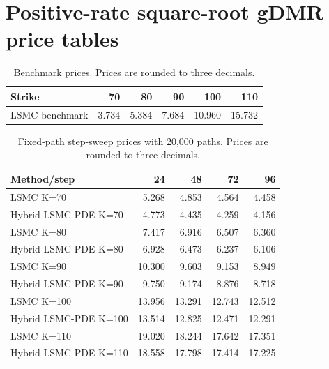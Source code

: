 \section*{Positive-rate square-root gDMR price tables}
\begin{table}[htbp]\centering
\caption{Benchmark prices. Prices are rounded to three decimals.}
\begin{tabular}{lrrrrr}
\toprule
Strike & 70 & 80 & 90 & 100 & 110 \\
\midrule
LSMC benchmark & 3.734 & 5.384 & 7.684 & 10.960 & 15.732 \\
\bottomrule
\end{tabular}
\end{table}

\begin{table}[htbp]\centering
\caption{Fixed-path step-sweep prices with 20,000 paths. Prices are rounded to three decimals.}
\begin{tabular}{lrrrr}
\toprule
Method/step & 24 & 48 & 72 & 96 \\
\midrule
LSMC K=70 & 5.268 & 4.853 & 4.564 & 4.458 \\
Hybrid LSMC-PDE K=70 & 4.773 & 4.435 & 4.259 & 4.156 \\
LSMC K=80 & 7.417 & 6.916 & 6.507 & 6.360 \\
Hybrid LSMC-PDE K=80 & 6.928 & 6.473 & 6.237 & 6.106 \\
LSMC K=90 & 10.300 & 9.603 & 9.153 & 8.949 \\
Hybrid LSMC-PDE K=90 & 9.750 & 9.174 & 8.876 & 8.718 \\
LSMC K=100 & 13.956 & 13.291 & 12.743 & 12.512 \\
Hybrid LSMC-PDE K=100 & 13.514 & 12.825 & 12.471 & 12.291 \\
LSMC K=110 & 19.020 & 18.244 & 17.642 & 17.351 \\
Hybrid LSMC-PDE K=110 & 18.558 & 17.798 & 17.414 & 17.225 \\
\bottomrule
\end{tabular}
\end{table}

